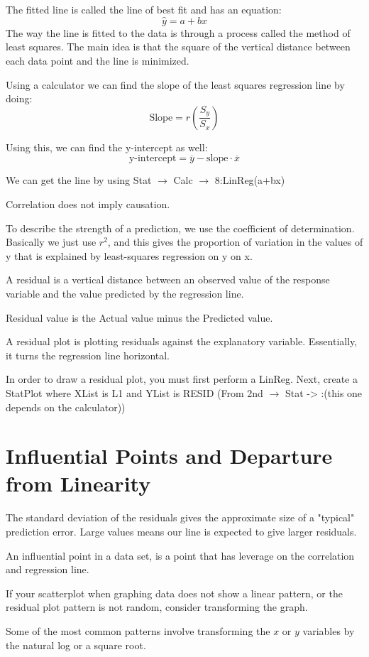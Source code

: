 \documentclass[../stats.tex]{subfiles}
\begin{document}
The fitted line is called the line of best fit and has an equation:
\[\hat{y}=a+bx\]
The way the line is fitted to the data is through a process called the method of least squares. 
The main idea is that the square of the vertical distance between each data point and the line is minimized. 

Using a calculator we can find the slope of the least squares regression line by doing:
\[\text{Slope}=r\left(\frac{S_y}{S_x}\right)\]

Using this, we can find the y-intercept as well:
\[\text{y-intercept}=\overline{y}-\text{slope}\cdot\overline{x}\]

We can get the line by using Stat $\rightarrow$ Calc $\rightarrow$ 8:LinReg(a+bx)

Correlation does not imply causation.

To describe the strength of a prediction, we use the coefficient of determination. 
Basically we just use $r^2$, and this gives the proportion of variation in the values of y that is 
explained by least-squares regression on y on x.

A residual is a vertical distance between an observed value of the response 
variable and the value predicted by the regression line. 

Residual value is the Actual value minus the Predicted value.

A residual plot is plotting residuals against the explanatory variable. Essentially, it turns the regression line horizontal. 

In order to draw a residual plot, you must first perform a LinReg. Next, create a 
StatPlot where XList is L1 and YList is RESID (From 2nd $\rightarrow$ Stat -> :(this one depends on the calculator))

\section{Influential Points and Departure from Linearity}
The standard deviation of the residuals gives the approximate size of a "typical" prediction error. Large values means our line is expected
to give larger residuals. 

An influential point in a data set, is a point that has leverage on the correlation and regression line. 

If your scatterplot when graphing data does not show a linear pattern, or the residual plot pattern is not random, consider transforming the graph.

Some of the most common patterns involve transforming the $x$ or $y$ variables by the natural log or a square root.
\end{document}
